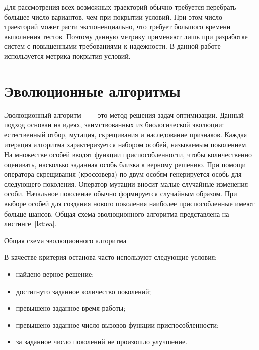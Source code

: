 Для рассмотрения всех возможных траекторий обычно требуется перебрать большее число вариантов, чем при покрытии условий. При этом число траекторий 
может расти экспоненциально, что требует большого времени выполнения тестов. Поэтому данную метрику применяют лишь при разработке систем с повышенными 
требованиями к надежности. В данной работе используется метрика покрытия условий.

\section{Эволюционные алгоритмы}
Эволюционный алгоритм~\cite{general_EA}~--- это метод решения задач оптимизации. Данный подход основан на идеях, заимствованных из биологической эволюции: 
естественный отбор, мутация, скрещивания и наследование признаков. Каждая итерация алгоритма характеризуется набором особей, называемым поколением. На множестве 
особей вводят функции приспособленности, чтобы количественно оценивать, насколько заданная особь близка к верному решению. При помощи оператора скрещивания 
(кроссовера) по двум особям генерируется особь для следующего поколения. Оператор мутации вносит малые случайные изменения особи. Начальное поколение обычно 
формируется случайным образом. При выборе особей для создания нового поколения наиболее приспособленные имеют больше шансов. Общая схема эволюционного 
алгоритма представлена на листинге~\ref{lst:ea}.

\begin{algorithm}[h!]
\caption{Общая схема эволюционного алгоритма}
\label{lst:ea}
\begin{algorithmic}[1]
  \ENDWHILE  
\end{algorithmic}
\end{algorithm}

В качестве критерия останова часто используют следующие условия:
\begin{itemize}
 \item найдено верное решение;
 \item достигнуто заданное количество поколений;
 \item превышено заданное время работы;
 \item превышено заданное число вызовов функции приспособленности;
 \item за заданное число поколений не произошло улучшение.
\end{itemize}


